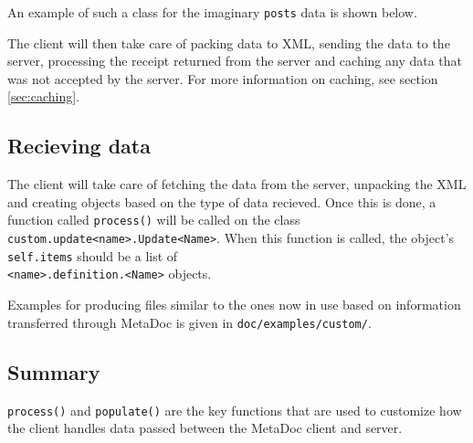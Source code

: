 An example of such a class for the imaginary \texttt{posts} data is shown
below.


The client will then take care of packing data to XML, sending the data to the
server, processing the receipt returned from the server and caching any data
that was not accepted by the server. For more information on caching, see
section \ref{sec:caching}.

\subsection{Recieving data}
\label{sec:customizing_client_recieve}
The client will take care of fetching the data from the server, unpacking the
XML and creating objects based on the type of data recieved. Once this is done,
a function called \texttt{process()} will be called on the class
\texttt{custom.update<name>.Update<Name>}. When this function is called, the
object's \texttt{self.items} should be a list of \\
\texttt{<name>.definition.<Name>} objects.

Examples for producing files similar to the ones now in use based on
information transferred through MetaDoc is given in
\texttt{doc/examples/custom/}.

\subsection{Summary}
\texttt{process()} and \texttt{populate()} are the key functions that are used
to customize how the client handles data passed between the MetaDoc client and
server. 
